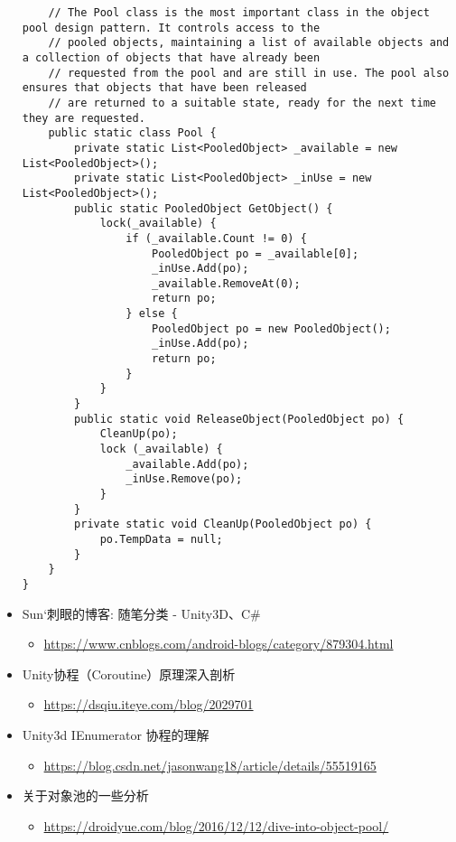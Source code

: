 \documentclass[9pt, b5paper]{article}
\begin{document}
\begin{itemize}
\begin{verbatim}
    // The Pool class is the most important class in the object pool design pattern. It controls access to the
    // pooled objects, maintaining a list of available objects and a collection of objects that have already been
    // requested from the pool and are still in use. The pool also ensures that objects that have been released
    // are returned to a suitable state, ready for the next time they are requested. 
    public static class Pool {
        private static List<PooledObject> _available = new List<PooledObject>();
        private static List<PooledObject> _inUse = new List<PooledObject>();
        public static PooledObject GetObject() {
            lock(_available) {
                if (_available.Count != 0) {
                    PooledObject po = _available[0];
                    _inUse.Add(po);
                    _available.RemoveAt(0);
                    return po;
                } else {
                    PooledObject po = new PooledObject();
                    _inUse.Add(po);
                    return po;
                }
            }
        }
        public static void ReleaseObject(PooledObject po) {
            CleanUp(po);
            lock (_available) {
                _available.Add(po);
                _inUse.Remove(po);
            }
        }
        private static void CleanUp(PooledObject po) {
            po.TempData = null;
        }
    }
}
\end{verbatim}

\item Sun‘刺眼的博客: 随笔分类 - Unity3D、C\#
\begin{itemize}
\item \url{https://www.cnblogs.com/android-blogs/category/879304.html}
\end{itemize}
\item Unity协程（Coroutine）原理深入剖析
\begin{itemize}
\item \url{https://dsqiu.iteye.com/blog/2029701}
\end{itemize}
\item Unity3d IEnumerator 协程的理解
\begin{itemize}
\item \url{https://blog.csdn.net/jasonwang18/article/details/55519165}
\end{itemize}
\item 关于对象池的一些分析
\begin{itemize}
\item \url{https://droidyue.com/blog/2016/12/12/dive-into-object-pool/}
\end{itemize}
\end{itemize}
\end{document}
